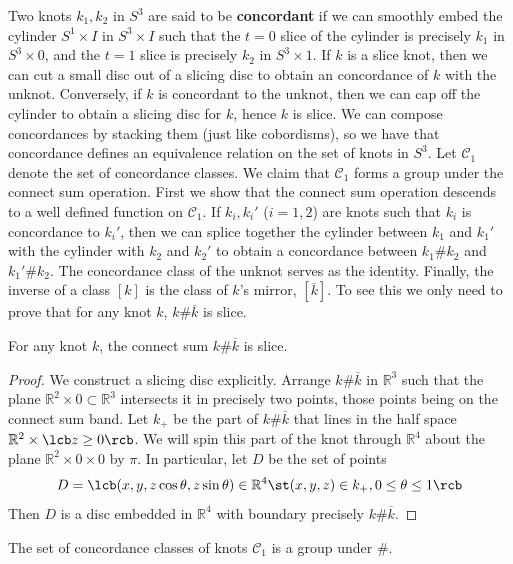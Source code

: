 Two knots $k_1,k_2$ in $S^3$ are said to be \textbf{concordant} if we can smoothly embed the cylinder $S^1 \times I$ in $S^3 \times I$ such that the $t=0$ slice of the cylinder is precisely $k_1$ in $S^3 \times 0$, and the $t=1$ slice is precisely $k_2$ in $S^3 \times 1$. If $k$ is a slice knot, then we can cut a small disc out of a slicing disc to obtain an concordance of $k$ with the unknot. Conversely, if $k$ is concordant to the unknot, then we can cap off the cylinder to obtain a slicing disc for $k$, hence $k$ is slice. We can compose concordances by stacking them (just like cobordisms), so we have that concordance defines an equivalence relation on the set of knots in $S^3$. Let $\mathcal C_1$ denote the set of concordance classes. We claim that $\mathcal C_1$ forms a group under the connect sum operation. First we show that the connect sum operation descends to a well defined function on $\mathcal C_1$. If $k_i,k_i'$ ($i=1,2$) are knots such that $k_i$ is concordance to $k_i'$, then we can splice together the cylinder between $k_1$ and $k_1'$ with the cylinder with $k_2$ and $k_2'$ to obtain a concordance between $k_1\# k_2$ and $k_1'\# k_2$. The concordance class of the unknot serves as the identity. Finally, the inverse of a class $[k]$ is the class of $k$'s mirror, $[\overline k]$. To see this we only need to prove that for any knot $k$, $k \# \overline k$ is slice.

\begin{prop}
For any knot $k$, the connect sum $k \# \overline k$ is slice.
\end{prop}
\begin{proof}
We construct a slicing disc explicitly. Arrange $k \# \overline k$ in $\mathbb R^3$ such that the plane $\mathbb R^2 \times 0 \subset \mathbb R^3$ intersects it in precisely two points, those points being on the connect sum band. Let $k_+$ be the part of $k \# \overline k$ that lines in the half space $\mathbb R^2 \times \lcb z \geq 0 \rcb$. We will spin this part of the knot through $\mathbb R^4$ about the plane $\mathbb R^2 \times 0 \times 0$ by $\pi$. In particular, let $D$ be the set of points
\[ D = \lcb (x,y,z \cos \theta,z \sin \theta) \in \mathbb R^4 \st (x,y,z) \in k_+, 0 \leq \theta \leq 1 \rcb \]
Then $D$ is a disc embedded in $\mathbb R^4$ with boundary precisely $k \# \overline k$. 
\end{proof}

\begin{cor}
The set of concordance classes of knots $\mathcal C_1$ is a group under $\#$.
\end{cor}

